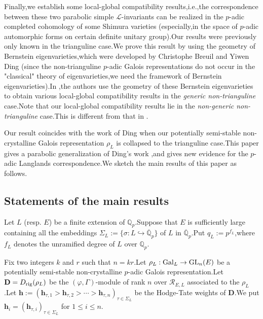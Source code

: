 \documentclass[SecEq,CM,GP]{degruyter-crelle} %
\theoremstyle{plain}
\newcommand{\Dpik}{{\mathbf{D}}}
\newcommand{\gal}{{\rm Gal}}
\newcommand{\GLN}{{\rm GL}}
\newcommand{\hpi}{{{\mathbf{h}}}}
\newcommand{\rig}{{\rm rig}}
\newcommand{\BQ}{{\mathbb{Q}}}
\newcommand{\bh}{{\mathbf{h}}}
\newcommand{\cR}{\mathcal R}
\newcommand{\sL}{\mathcal L}
\begin{document}
Finally,\;we establish some local-global compatibility results,\;i.e.,\;the correspondence between these two parabolic simple $\sL$-invariants can be realized in the $p$-adic completed cohomology  of some Shimura varieties (especially,\;in the space of $p$-adic automorphic forms on certain definite unitary group).\;Our results were previously only known in the trianguline case.\;We prove this result by using the geometry of Bernstein eigenvarieties,\;which were developed by Christophe Breuil and  Yiwen  Ding \cite{Ding2021} (since the non-trianguline $p$-adic Galois representations do not occur in the "classical" theory of eigenvarieties,\;we need the framework of Bernstein eigenvarieties).\;In \cite{Ding2021},\;the authors use the geometry of these Bernstein eigenvarieties to obtain various local-global compatibility results in the \textit{generic non-trianguline} case.\;Note that our local-global compatibility results lie in the \textit{non-generic non-trianguline} case.\;This is different from that in \cite{Ding2021}.\;

Our result coincides with the work of Ding \cite{2019DINGSimple} when our potentially semi-stable non-crystalline  Galois representation $\rho_L$ is collapsed to the trianguline case.\;This paper gives a parabolic generalization of Ding's work \cite{2019DINGSimple},\;and gives new evidence for the $p$-adic Langlands correspondence.\;We sketch the main results of this paper as follows.\;

\subsection{Statements of the main results}
Let $L$ (resp. $E$) be a finite extension of $\BQ_p$.\;Suppose that $E$ is sufficiently large containing all the embeddings $\Sigma_L:=\{\sigma: L\hookrightarrow \overline{\BQ}_p\}$ of $L$ in $\overline{\BQ}_p$.\;Put $q_L:=p^{f_L}$,\;where $f_L$ denotes the unramified degree of $L$ over $\BQ_p$.\;



Fix two integers $k$ and $r$ such that $n=kr$.\;Let $\rho_L:\gal_L\rightarrow \GLN_n(E)$ be a potentially semi-stable non-crystalline $p$-adic Galois representation.\;Let $\Dpik=D_{\rig}(\rho_L)$ be the $(\varphi,\Gamma)$-module of rank $n$ over $\cR_{E,L}$ associated to the $\rho_L$.\;Let  $\bh:=(\hpi_{\tau,1}>\hpi_{\tau,2}>\cdots>\hpi_{\tau,n} )_{\tau\in \Sigma_L}$ be the Hodge-Tate weights of $\Dpik$.\;We put $\hpi_{i}=(\hpi_{\tau,i})_{\tau\in \Sigma_L}$ for $1\leq i\leq n$.\;
\end{document}
